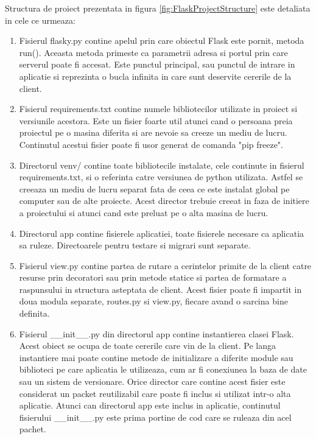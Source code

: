 Structura de proiect prezentata in figura \ref{fig:FlaskProjectStructure} este detaliata in cele ce urmeaza:
\begin{enumerate}
	\item Fisierul flasky.py contine apelul prin care obiectul Flask este pornit, metoda run(). Aceasta metoda primeste ca parametrii adresa si 
    portul prin care serverul poate fi accesat. Este punctul principal, sau punctul de intrare in aplicatie si reprezinta o bucla infinita 
    in care sunt deservite cererile de la client.
	\item Fisierul requirements.txt contine numele bibliotecilor utilizate in proiect si versiunile acestora. Este un fisier foarte util atunci 
	cand o persoana preia proiectul pe o masina diferita si are nevoie sa creeze un mediu de lucru. Continutul acestui fisier poate fi usor generat 
    de comanda "pip freeze".
    \item Directorul venv/ contine toate bibliotecile instalate, cele continute in fisierul requirements.txt, si o referinta catre versiunea de python 
    utilizata. Astfel se creeaza un mediu de lucru separat fata de ceea ce este instalat global pe computer sau de alte proiecte. Acest director 
    trebuie creeat in faza de initiere a proiectului si atunci cand este preluat pe o alta masina de lucru.
    \item Directorul app contine fisierele aplicatiei, toate fisierele necesare ca aplicatia sa ruleze. Directoarele pentru testare si migrari sunt 
    separate.
    \item Fisierul view.py contine partea de rutare a cerintelor primite de la client catre resurse prin decoratori sau prin metode statice si 
    partea de formatare a raspunsului in structura asteptata de client. Acest fisier poate fi impartit in doua modula separate, routes.py si 
    view.py, fiecare avand o sarcina bine definita.
    \item Fisierul \_\_init\_\_.py din directorul app contine instantierea clasei Flask. Acest obiect se ocupa de toate cererile care vin de la client. 
    Pe langa instantiere mai poate contine metode de initializare a diferite module sau biblioteci pe care aplicatia le utilizeaza, cum ar fi conexiunea 
    la baza de date sau un sistem de versionare. Orice director care contine acest fisier este considerat un packet reutilizabil care poate fi inclus si 
    utilizat intr-o alta aplicatie. Atunci can directorul app este inclus in aplicatie, continutul fisierului \_\_init\_\_.py este prima portine de 
    cod care se ruleaza din acel pachet. 
\end{enumerate}

